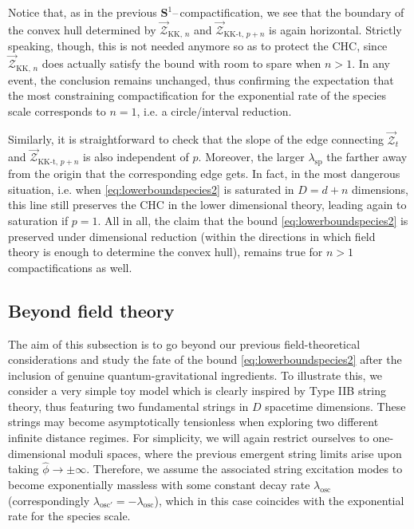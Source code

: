 %
Notice that, as in the previous $\mathbf{S}^1$--\,compactification, we see that the boundary of the convex hull determined by $\vec{\mathcal{Z}}_{\text{KK},\, n}$ and $\vec{\mathcal{Z}}_{\text{KK-t},\, p+n}$ is again horizontal. Strictly speaking, though, this is not needed anymore so as to protect the CHC, since $\vec{\mathcal{Z}}_{\text{KK},\, n}$ does actually satisfy the bound with room to spare when $n>1$. In any event, the conclusion remains unchanged, thus confirming the expectation that the most constraining compactification for the exponential rate of the species scale corresponds to $n=1$, i.e. a circle/interval reduction.

Similarly, it is straightforward to check that the slope of the edge connecting $\vec{\mathcal{Z}}_{t}$ and $\vec{\mathcal{Z}}_{\text{KK-t},\, p+n}$ is also independent of $p$. Moreover, the larger $\lambda_{\text{sp}}$ the farther away from the origin that the corresponding edge gets. In fact, in the most dangerous situation, i.e. when \eqref{eq:lowerboundspecies2} is saturated in $D=d+n$ dimensions, this line still preserves the CHC in the lower dimensional theory, leading again to saturation if $p = 1$. %
All in all, the claim that the bound \eqref{eq:lowerboundspecies2} is preserved under dimensional reduction (within the directions in which field theory is enough to determine the convex hull), remains true for $n>1$ compactifications as well.    

\subsection{Beyond field theory}
\label{ss:compactificationstring}

The aim of this subsection is to go beyond our previous field-theoretical considerations and study the fate of the bound \eqref{eq:lowerboundspecies2} after the inclusion of genuine quantum-gravitational ingredients. To illustrate this, we consider a very simple toy model which is clearly inspired by Type IIB string theory, thus featuring two fundamental strings in $D$ spacetime dimensions. These strings may become asymptotically tensionless when exploring two different infinite distance regimes. For simplicity, we will again restrict ourselves to one-dimensional moduli spaces, where the previous emergent string limits arise upon taking $\hat \phi \to \pm \infty$. Therefore, we assume the associated string excitation modes to become exponentially massless with some constant decay rate $\lambda_{\text{osc}}$ (correspondingly $\lambda_{\text{osc}'} =-\lambda_{\text{osc}}$), which in this case coincides with the exponential rate for the species scale. 


